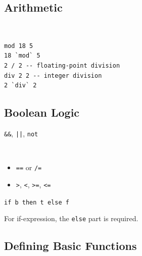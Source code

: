 \documentclass{article}
\begin{document}
\subsection{Arithmetic}
\begin{example}~
    \begin{verbatim}
mod 18 5
18 `mod` 5
2 / 2 -- floating-point division
div 2 2 -- integer division
2 `div` 2
\end{verbatim}
\end{example}

\subsection{Boolean Logic}
\begin{definition}
    \verb|&&|, \verb~||~, \verb|not|
\end{definition}

\begin{definition}~
    \begin{itemize}
        \item \verb|==| or \verb|/=|
        \item \verb|>|, \verb|<|, \verb|>=|, \verb|<=|
    \end{itemize}
\end{definition}

\begin{definition}[if-expression]
    \verb|if b then t else f|
\end{definition}

\begin{remark}
    For if-expression, the \verb|else| part is required.
\end{remark}

\subsection{Defining Basic Functions}


\printbibliography
\end{document}
